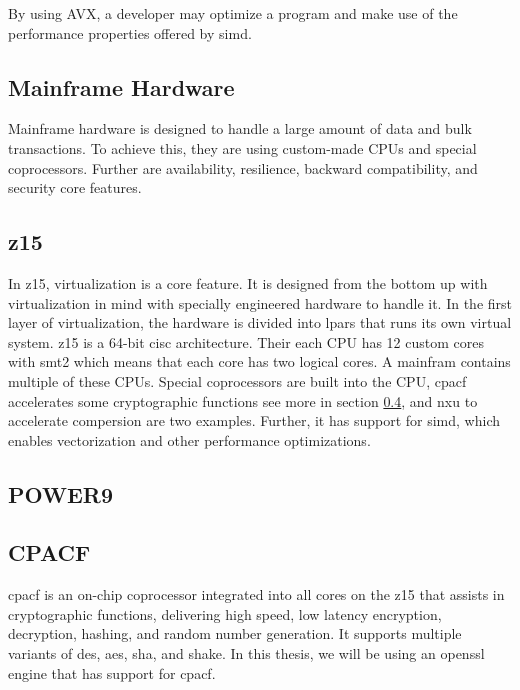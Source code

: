 By using AVX, a developer may optimize a program and make use of the performance properties offered by \gls{simd}\cite{hennessy2011:avx}.

\subsection{Mainframe Hardware}

Mainframe hardware is designed to handle a large amount of data and bulk transactions. To achieve this, they are using custom-made CPUs and special coprocessors. Further are availability, resilience, backward compatibility, and security core features.



\subsection{z15}
In z15, virtualization is a core feature. It is designed from the bottom up with virtualization in mind with specially engineered hardware to handle it. In the first layer of virtualization, the hardware is divided into \glspl{lpar} that runs its own virtual system. z15 is a 64-bit \gls{cisc} architecture. Their each CPU has 12 custom cores with \gls{smt}2 which means that each core has two logical cores. A mainfram contains multiple of these CPUs. Special coprocessors are built into the CPU, \gls{cpacf} accelerates some cryptographic functions see more in section \ref{subsection:cpacf}, and \gls{nxu} to accelerate compersion are two examples. Further, it has support for \gls{simd}, which enables vectorization and other performance optimizations\cite{redbook:z15}.

\subsection{POWER9}

\subsection{CPACF}
\label{subsection:cpacf}
\gls{cpacf} is an on-chip coprocessor integrated into all cores on the z15 that assists in cryptographic functions, delivering high speed, low latency encryption, decryption, hashing, and random number generation. It supports multiple variants of \gls{des}, \gls{aes}, \gls{sha}, and \gls{shake}. In this thesis, we will be using an \gls{openssl} engine that has support for \gls{cpacf}\cite{redbook:z15}.

